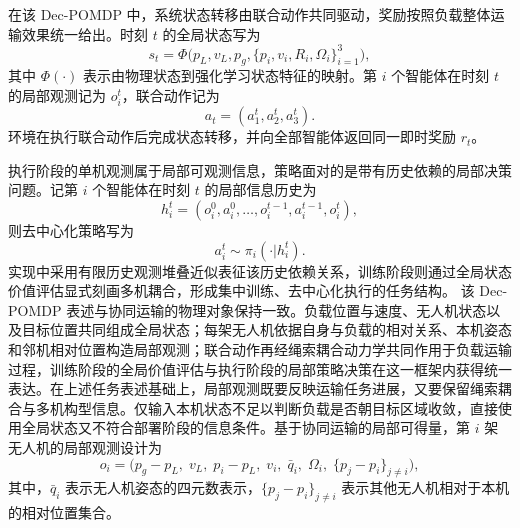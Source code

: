 在该 Dec-POMDP 中，系统状态转移由联合动作共同驱动，奖励按照负载整体运输效果统一给出。时刻 $t$ 的全局状态写为
\begin{equation}
    s_t = \Phi\big(p_L,v_L,p_g,\{p_i,v_i,R_i,\Omega_i\}_{i=1}^{3}\big),
\end{equation}
其中 $\Phi(\cdot)$ 表示由物理状态到强化学习状态特征的映射。第 $i$ 个智能体在时刻 $t$ 的局部观测记为 $o_i^t$，联合动作记为
\begin{equation}
    a_t = (a_1^t,a_2^t,a_3^t).
\end{equation}
环境在执行联合动作后完成状态转移，并向全部智能体返回同一即时奖励 $r_t$。

执行阶段的单机观测属于局部可观测信息，策略面对的是带有历史依赖的局部决策问题。记第 $i$ 个智能体在时刻 $t$ 的局部信息历史为
\begin{equation}
    h_i^t = (o_i^0,a_i^0,\dots,o_i^{t-1},a_i^{t-1},o_i^t),
\end{equation}
则去中心化策略写为
\begin{equation}
    a_i^t \sim \pi_i(\cdot|h_i^t).
\end{equation}
实现中采用有限历史观测堆叠近似表征该历史依赖关系，训练阶段则通过全局状态价值评估显式刻画多机耦合，形成集中训练、去中心化执行的任务结构。
该 Dec-POMDP 表述与协同运输的物理对象保持一致。负载位置与速度、无人机状态以及目标位置共同组成全局状态；每架无人机依据自身与负载的相对关系、本机姿态和邻机相对位置构造局部观测；联合动作再经绳索耦合动力学共同作用于负载运输过程，训练阶段的全局价值评估与执行阶段的局部策略决策在这一框架内获得统一表达。在上述任务表述基础上，局部观测既要反映运输任务进展，又要保留绳索耦合与多机构型信息。仅输入本机状态不足以判断负载是否朝目标区域收敛，直接使用全局状态又不符合部署阶段的信息条件。基于协同运输的局部可得量，第 $i$ 架无人机的局部观测设计为
\begin{equation}
    o_i =
    \big(
    p_g-p_L,\;
    v_L,\;
    p_i-p_L,\;
    v_i,\;
    \bar q_i,\;
    \Omega_i,\;
    \{p_j-p_i\}_{j\ne i}
    \big),
\end{equation}
其中，$\bar q_i$ 表示无人机姿态的四元数表示，$\{p_j-p_i\}_{j\ne i}$ 表示其他无人机相对于本机的相对位置集合。
